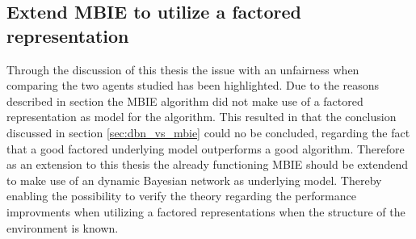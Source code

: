 \subsection{Extend MBIE to utilize a factored representation }
Through the discussion of this thesis the issue with an unfairness when comparing the two agents studied has been highlighted. Due to the reasons described in section  the MBIE algorithm did not make use of a factored representation as model for the algorithm. This resulted in that the conclusion discussed in section \ref{sec:dbn_vs_mbie} could no be concluded, regarding the fact that a good factored underlying model outperforms a good algorithm. Therefore as an extension to this thesis the already functioning MBIE should be extendend to make use of an dynamic Bayesian network as underlying model. Thereby enabling the possibility to verify the theory regarding the performance improvments when utilizing a factored representations when the structure of the environment is known.
